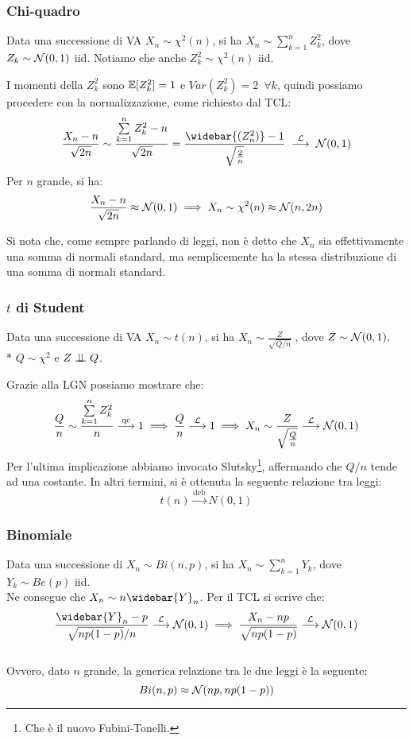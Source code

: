 \subsubsection{Chi-quadro}
Data una successione di VA $X_n \sim \chi^2(n)$, si ha $X_n \sim \sum\limits_{k=1}^{n} Z_k^2$, dove $Z_k \sim \mathcal N(0,1)$ iid. Notiamo che anche $Z_k^2 \sim \chi^2(n)$ iid.

I momenti della $Z_k^2$ sono $\mathbb E[Z_k^2] = 1$ e $Var(Z_k^2) = 2 \enspace \forall k$, quindi possiamo procedere con la normalizzazione, come richiesto dal TCL:
$$\frac{X_n - n}{\sqrt{2n}} \sim \frac{\sum\limits_{k=1}^{n} Z_k^2 - n}{\sqrt{2n}} = \frac{\widebar{(Z_n^2)} - 1}{\sqrt{\frac{2}{n}}}
\; \stackrel{\Lc}{\longrightarrow} \; \Nc(0,1) $$ %
Per $n$ grande, si ha:
$$\frac{X_n-n}{\sqrt{2n}} \approx \mathcal N(0,1) \implies X_n \sim \chi^2(n) \approx \mathcal N(n,2n)$$
\begin{nb}
	Si nota che, come sempre parlando di leggi, non è detto che $X_n$ sia effettivamente una somma di normali standard, ma semplicemente ha la stessa distribuzione di una somma di normali standard.
\end{nb}

\subsubsection{$t$ di Student}
Data una successione di VA $X_n \sim t(n)$, si ha $X_n \sim \frac{Z}{\sqrt{Q/n}} \;$, dove $Z \sim \mathcal N(0,1),$ \\*
$Q \sim \chi^2$ e $Z \indep Q$.

Grazie alla LGN possiamo mostrare che:
$$\frac{Q}{n} \sim \frac{\sum\limits_{k=1}^{n} Z_k^2}{n} \stackrel{\text{qc}}{\longrightarrow} 1
\implies \frac{Q}{n} \stackrel{\mathcal L}{\longrightarrow} 1
\implies X_n \sim \frac{Z}{\sqrt{\frac{Q}{n}}} \stackrel{\mathcal L}{\longrightarrow} \mathcal N(0,1)$$
Per l'ultima implicazione abbiamo invocato Slutsky\footnote{Che è il nuovo Fubini-Tonelli.}, affermando che $Q/n$ tende ad una costante.
In altri termini, si è ottenuta la seguente relazione tra leggi:
$$t(n) \xrightarrow{\text{deb}} N(0,1)$$

\subsubsection{Binomiale}
Data una successione di $X_n \sim Bi(n,p)$, si ha $X_n \sim \sum\limits_{k=1}^{n} Y_k$, dove $Y_k \sim Be(p)$ iid.\\
Ne consegue che $X_n \sim n\widebar{Y}_n$.
Per il TCL si scrive che: $$\frac{\widebar{Y}_n - p}{\sqrt{np(1-p)}/n} \stackrel{\Lc}{\longrightarrow} \Nc(0,1) \implies \frac{X_n - np}{\sqrt{np(1-p)}} \stackrel{\Lc}{\longrightarrow} \Nc(0,1)$$\\
Ovvero, dato $n$ grande, la generica relazione tra le due leggi è la seguente:
$$Bi(n,p) \approx \mathcal N(np, np(1-p))$$

